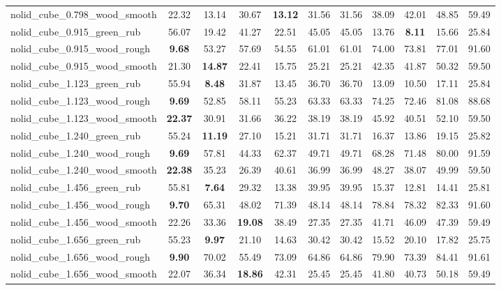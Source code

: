 \begin{table}[H]
{\begin{tabular}{l cccccccccc}
        nolid\_cube\_0.798\_wood\_smooth & 22.32 & 13.14 & 30.67 & \textbf{13.12} & 31.56 & 31.56 & 38.09 & 42.01 & 48.85 & 59.49 \\
        nolid\_cube\_0.915\_green\_rub & 56.07 & 19.42 & 41.27 & 22.51 & 45.05 & 45.05 & 13.76 & \textbf{8.11} & 15.66 & 25.84 \\
        nolid\_cube\_0.915\_wood\_rough & \textbf{9.68} & 53.27 & 57.69 & 54.55 & 61.01 & 61.01 & 74.00 & 73.81 & 77.01 & 91.60 \\
        nolid\_cube\_0.915\_wood\_smooth & 21.30 & \textbf{14.87} & 22.41 & 15.75 & 25.21 & 25.21 & 42.35 & 41.87 & 50.32 & 59.50 \\
        nolid\_cube\_1.123\_green\_rub & 55.94 & \textbf{8.48} & 31.87 & 13.45 & 36.70 & 36.70 & 13.09 & 10.50 & 17.11 & 25.84 \\
        nolid\_cube\_1.123\_wood\_rough & \textbf{9.69} & 52.85 & 58.11 & 55.23 & 63.33 & 63.33 & 74.25 & 72.46 & 81.08 & 88.68 \\
        nolid\_cube\_1.123\_wood\_smooth & \textbf{22.37} & 30.91 & 31.66 & 36.22 & 38.19 & 38.19 & 45.92 & 40.51 & 52.10 & 59.50 \\
        nolid\_cube\_1.240\_green\_rub & 55.24 & \textbf{11.19} & 27.10 & 15.21 & 31.71 & 31.71 & 16.37 & 13.86 & 19.15 & 25.82 \\
        nolid\_cube\_1.240\_wood\_rough & \textbf{9.69} & 57.81 & 44.33 & 62.37 & 49.71 & 49.71 & 68.28 & 71.48 & 80.00 & 91.59 \\
        nolid\_cube\_1.240\_wood\_smooth & \textbf{22.38} & 35.23 & 26.39 & 40.61 & 36.99 & 36.99 & 48.27 & 38.07 & 49.99 & 59.50 \\
        nolid\_cube\_1.456\_green\_rub & 55.81 & \textbf{7.64} & 29.32 & 13.38 & 39.95 & 39.95 & 15.37 & 12.81 & 14.41 & 25.81 \\
        nolid\_cube\_1.456\_wood\_rough & \textbf{9.70} & 65.31 & 48.02 & 71.39 & 48.14 & 48.14 & 78.84 & 78.32 & 82.33 & 91.60 \\
        nolid\_cube\_1.456\_wood\_smooth & 22.26 & 33.36 & \textbf{19.08} & 38.49 & 27.35 & 27.35 & 41.71 & 46.09 & 47.39 & 59.49 \\
        nolid\_cube\_1.656\_green\_rub & 55.23 & \textbf{9.97} & 21.10 & 14.63 & 30.42 & 30.42 & 15.52 & 20.10 & 17.82 & 25.75 \\
        nolid\_cube\_1.656\_wood\_rough & \textbf{9.90} & 70.02 & 55.49 & 73.09 & 64.86 & 64.86 & 79.90 & 73.39 & 84.41 & 91.61 \\
        nolid\_cube\_1.656\_wood\_smooth & 22.07 & 36.34 & \textbf{18.86} & 42.31 & 25.45 & 25.45 & 41.80 & 40.73 & 50.18 & 59.49 \\

\end{tabular}}
\end{table}
